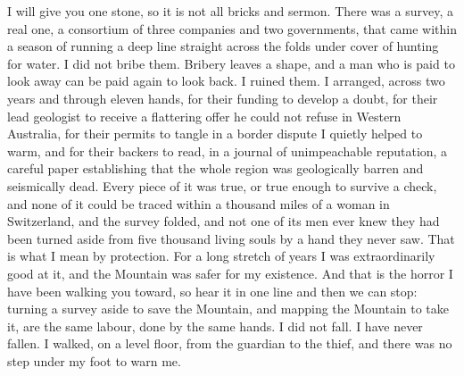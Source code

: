 I will give you one stone, so it is not all bricks and sermon. There was a survey, a real one, a consortium of three companies and two governments, that came within a season of running a deep line straight across the folds under cover of hunting for water. I did not bribe them. Bribery leaves a shape, and a man who is paid to look away can be paid again to look back. I ruined them. I arranged, across two years and through eleven hands, for their funding to develop a doubt, for their lead geologist to receive a flattering offer he could not refuse in Western Australia, for their permits to tangle in a border dispute I quietly helped to warm, and for their backers to read, in a journal of unimpeachable reputation, a careful paper establishing that the whole region was geologically barren and seismically dead. Every piece of it was true, or true enough to survive a check, and none of it could be traced within a thousand miles of a woman in Switzerland, and the survey folded, and not one of its men ever knew they had been turned aside from five thousand living souls by a hand they never saw. That is what I mean by protection. For a long stretch of years I was extraordinarily good at it, and the Mountain was safer for my existence. And that is the horror I have been walking you toward, so hear it in one line and then we can stop: turning a survey aside to save the Mountain, and mapping the Mountain to take it, are the same labour, done by the same hands. I did not fall. I have never fallen. I walked, on a level floor, from the guardian to the thief, and there was no step under my foot to warn me.\par

